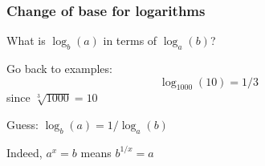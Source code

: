 \documentclass{beamer}
\renewcommand{\alert}[1]{\textcolor{MyTeal}{#1}}
\begin{document}
      \begin{frame}
        \frametitle{Change of base for logarithms}

        \begin{center}
          What is $\log_b(a)$ in terms of $\log_a(b)$?
        \end{center}

        \pause

        Go back to examples:
        $$
        \log_{1000}(10) = 1/3
        $$
        since $\sqrt[3]{1000} = 10$

        \pause
        \bigskip
       \alert{Guess:} $\log_b(a) = 1 / \log_a(b)$

        \pause

        \bigskip

        Indeed, $a^x = b$ means $b^{1/x} = a$
      \end{frame}
\end{document}
